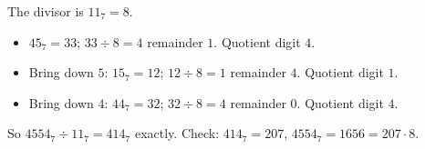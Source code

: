 The divisor is $11_7=8$.
\begin{itemize}
\item $45_7=33$; $33\div8=4$ remainder $1$. Quotient digit $4$.
\item Bring down $5$: $15_7=12$; $12\div8=1$ remainder $4$. Quotient digit $1$.
\item Bring down $4$: $44_7=32$; $32\div8=4$ remainder $0$. Quotient digit $4$.
\end{itemize}
So $4554_7\div11_7=\boxed{414_7}$ exactly. Check: $414_7=207$, $4554_7=1656=207\cdot8$.
